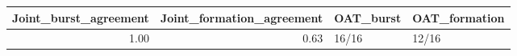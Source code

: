 \begin{tabular}{rrll}
\toprule
Joint_burst_agreement & Joint_formation_agreement & OAT_burst & OAT_formation \\
\midrule
1.00 & 0.63 & 16/16 & 12/16 \\
\bottomrule
\end{tabular}
